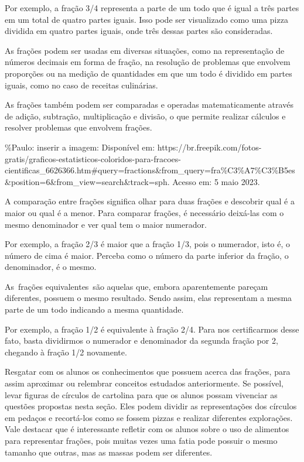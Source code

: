 Por exemplo, a fração 3/4 representa a parte de um todo que é igual a
três partes em um total de quatro partes iguais. Isso pode ser
visualizado como uma pizza dividida em quatro partes iguais, onde três
dessas partes são consideradas.

As frações podem ser usadas em diversas situações, como na representação
de números decimais em forma de fração, na resolução de problemas que
envolvem proporções ou na medição de quantidades em que um todo é
dividido em partes iguais, como no caso de receitas culinárias.

As frações também podem ser comparadas e operadas matematicamente
através de adição, subtração, multiplicação e divisão, o que permite
realizar cálculos e resolver problemas que envolvem frações.

\%Paulo: inserir a imagem: Disponível em:
https://br.freepik.com/fotos-gratis/graficos-estatisticos-coloridos-para-fracoes-cientificas\_6626366.htm\#query=fractions\&from\_query=fra\%C3\%A7\%C3\%B5es\&position=6\&from\_view=search\&track=sph.
Acesso em: 5 maio 2023.

A comparação entre frações significa olhar para duas frações e descobrir
qual é a maior ou qual é a menor. Para comparar frações, é necessário
deixá-las com o mesmo denominador e ver qual tem o maior numerador.

Por exemplo, a fração 2/3 é maior que a fração 1/3, pois o numerador,
isto é, o número de cima é maior. Perceba como o número da parte
inferior da fração, o denominador, é o mesmo.

As~frações equivalentes~são aquelas que, embora aparentemente pareçam
diferentes, possuem o mesmo resultado. Sendo assim, elas representam a
mesma parte de um todo indicando a mesma quantidade.

Por exemplo, a fração 1/2 é equivalente à fração 2/4. Para nos
certificarmos desse fato, basta dividirmos o numerador e denominador da
segunda fração por 2, chegando à fração 1/2 novamente.

Resgatar com os alunos os conhecimentos que possuem acerca das frações,
para assim aproximar ou relembrar conceitos estudados anteriormente. Se
possível, levar figuras de círculos de cartolina para que os alunos
possam vivenciar as questões propostas nesta seção. Eles podem dividir
as representações dos círculos em pedaços e recortá-los como se fossem
pizzas e realizar diferentes explorações. Vale destacar que é
interessante refletir com os alunos sobre o uso de alimentos para
representar frações, pois muitas vezes uma fatia pode possuir o mesmo
tamanho que outras, mas as massas podem ser diferentes.

